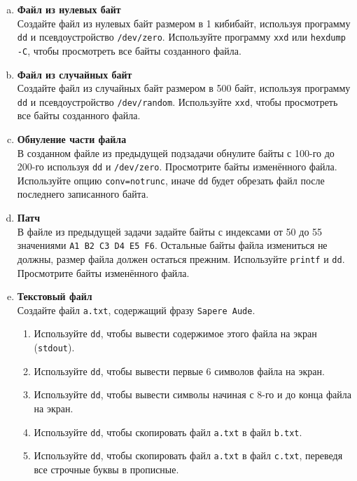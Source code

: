 \documentclass{article}
\begin{document}
\begin{enumerate}[(a)]
\item \textbf{Файл из нулевых байт}\\
Создайте файл из нулевых байт размером в 1 кибибайт, используя программу \texttt{dd} и псевдоустройство \texttt{/dev/zero}. Используйте программу \texttt{xxd} или \texttt{hexdump -C}, чтобы просмотреть все байты созданного файла.

\item \textbf{Файл из случайных байт}\\
Создайте файл из случайных байт размером в 500 байт, используя программу \texttt{dd} и псевдоустройство \texttt{/dev/random}. Используйте \texttt{xxd}, чтобы просмотреть все байты созданного файла.


\item \textbf{Обнуление части файла}\\
В созданном файле из предыдущей подзадачи обнулите байты с 100-го до 200-го используя \texttt{dd} и \texttt{/dev/zero}. Просмотрите байты изменённого файла. Используйте опцию \texttt{conv=notrunc}, иначе \texttt{dd} будет обрезать файл после последнего записанного байта.

\item \textbf{Патч}\\
В файле из предыдущей задачи задайте байты с индексами от 50 до 55 значениями \texttt{A1 B2 C3 D4 E5 F6}. Остальные байты файла измениться не должны, размер файла должен остаться прежним. Используйте \texttt{printf} и \texttt{dd}. Просмотрите байты изменённого файла.

\item \textbf{Текстовый файл}\\
Создайте файл \texttt{a.txt}, содержащий фразу \texttt{Sapere Aude}.
\begin{enumerate}
\item Используйте \texttt{dd}, чтобы вывести содержимое этого файла на экран (\texttt{stdout}).
\item Используйте \texttt{dd}, чтобы вывести первые 6 символов файла на экран.
\item Используйте \texttt{dd}, чтобы вывести символы начиная с 8-го и до конца файла на экран.
\item Используйте \texttt{dd}, чтобы скопировать файл \texttt{a.txt} в файл \texttt{b.txt}.
\item Используйте \texttt{dd}, чтобы скопировать файл \texttt{a.txt} в файл \texttt{c.txt}, переведя все строчные буквы в прописные.
\end{enumerate}


\end{enumerate}
\end{document}
